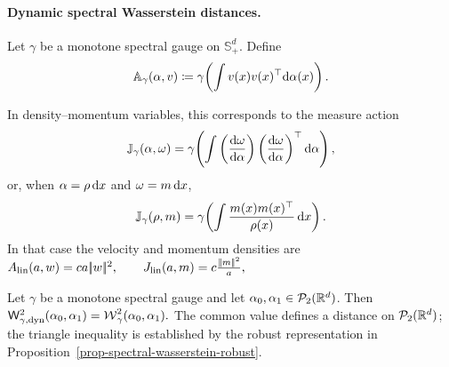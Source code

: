 \paragraph{Dynamic spectral Wasserstein distances.}
\begin{defn}\label{def-dynamic-spectral-wasserstein}
Let $\gamma$ be a monotone spectral gauge on $\mathbb S_+^d$. Define
\begin{equation}\label{eq-spectral-tangent-action}
\mathbb A_\gamma(\alpha,v)
\coloneqq
\gamma\!\left(\int v(x)v(x)^\top\mathrm{d}\alpha(x)\right).
\end{equation}
\end{defn}
In density--momentum variables, this corresponds to the measure action
\[
\mathbb J_\gamma(\alpha,\omega)
=
\gamma\!\left(\int
\left(\frac{\mathrm{d}\omega}{\mathrm{d}\alpha}\right)
\left(\frac{\mathrm{d}\omega}{\mathrm{d}\alpha}\right)^\top
\mathrm{d}\alpha\right),
\]
or, when \(\alpha=\rho\,\mathrm{d} x\) and \(\omega=m\,\mathrm{d} x\),
\[
\mathbb J_\gamma(\rho,m)
=
\gamma\!\left(\int \frac{m(x)m(x)^\top}{\rho(x)}\,\mathrm{d} x\right).
\]
In that case the velocity and momentum densities are \(A_{\mathrm{lin}}(a,w)=ca|\!| w |\!|^2, \qquad J_{\mathrm{lin}}(a,m)=c\frac{|\!| m |\!|^2}{a},\)
\begin{prop}\label{prop-static-dynamic-spectral-wasserstein}
Let $\gamma$ be a monotone spectral gauge and let $\alpha_0,\alpha_1\in\mathcal{P}_2(\mathbb{R}^d)$. Then
\(\mathsf W_{\gamma,\mathrm{dyn}}^2(\alpha_0,\alpha_1) = \operatorname{\mathcal{W}}_\gamma^2(\alpha_0,\alpha_1).\)
The common value defines a distance on $\mathcal{P}_2(\mathbb{R}^d)$; the triangle inequality is established by the robust representation in Proposition~\ref{prop-spectral-wasserstein-robust}.
\end{prop}
